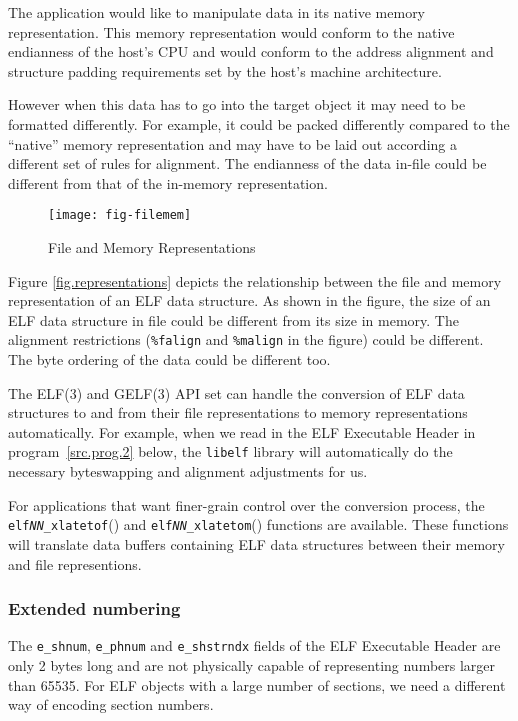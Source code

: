 \documentclass[a4paper]{report}
\newcommand{\function}[1]{\texttt{#1}()}
\newcommand{\library}[1]{\texttt{#1}}
\newcommand{\parameter}[1]{\texttt{#1}}
\begin{document}
The application would like to manipulate data in its native memory
representation.  This memory representation would conform to the
native endianness of the host's CPU and would conform to the address
alignment and structure padding requirements set by the host's machine
architecture.

However when this data has to go into the target object it may need to
be formatted differently.  For example, it could be packed differently
compared to the ``native'' memory representation and may have to be
laid out according a different set of rules for alignment.  The
endianness of the data in-file could be different from that of the
in-memory representation.

\begin{figure}
  \caption{File and Memory Representations}\label{fig.representations}
  \begin{center}
    \texttt{[image: fig-filemem]}
  \end{center}
\end{figure}

Figure \vref{fig.representations} depicts the relationship between the
file and memory representation of an ELF data structure.  As shown in
the figure, the size of an ELF data structure in file could be
different from its size in memory.  The alignment restrictions
(\parameter{\%falign} and \parameter{\%malign} in the figure) could be
different.  The byte ordering of the data could be different too.

The ELF(3) and GELF(3) API set can handle the conversion of ELF data
structures to and from their file representations to memory
representations automatically.  For example, when we read in the ELF
Executable Header in program~\vref{src.prog.2} below, the \library{libelf}
library will automatically do the necessary byteswapping and alignment
adjustments for us.

For applications that want finer-grain control over the conversion
process, the \function{elf\textit{NN}\_xlatetof} and
\function{elf\textit{NN}\_xlatetom} functions are available.  These
functions will translate data buffers containing ELF data structures
between their memory and file representions.

\subsubsection{Extended numbering}\label{sec.extended-numbering}
        
The \parameter{e\_shnum}, \parameter{e\_phnum} and
\parameter{e\_shstrndx} fields of the ELF Executable Header are only 2
bytes long and are not physically capable of representing numbers
larger than 65535.  For ELF objects with a large number of sections,
we need a different way of encoding section numbers.
\end{document}
